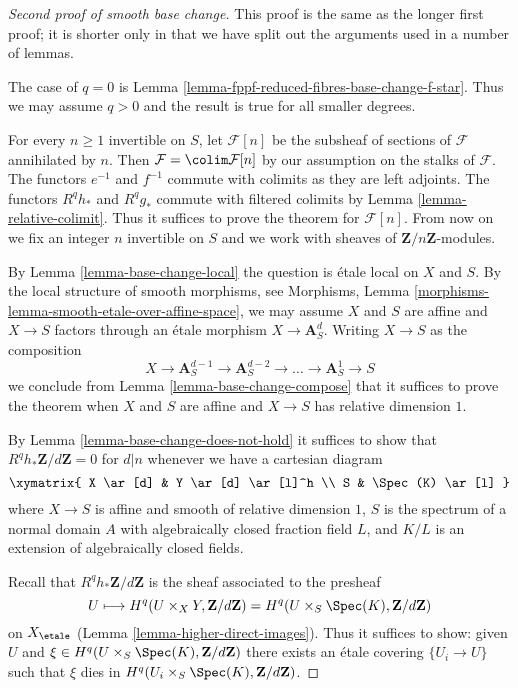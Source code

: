 \begin{proof}[Second proof of smooth base change]
This proof is the same as the longer first proof;
it is shorter only in that we have split out the
arguments used in a number of lemmas.

\medskip\noindent
The case of $q = 0$ is
Lemma \ref{lemma-fppf-reduced-fibres-base-change-f-star}.
Thus we may assume $q > 0$ and the result is true
for all smaller degrees.

\medskip\noindent
For every $n \geq 1$ invertible on $S$, let $\mathcal{F}[n]$
be the subsheaf of sections of $\mathcal{F}$ annihilated by $n$. Then
$\mathcal{F} = \colim \mathcal{F}[n]$ by our assumption on
the stalks of $\mathcal{F}$. The functors $e^{-1}$ and $f^{-1}$
commute with colimits as they are left adjoints. The functors
$R^qh_*$ and $R^qg_*$ commute with filtered colimits by
Lemma \ref{lemma-relative-colimit}.
Thus it suffices to prove the theorem for $\mathcal{F}[n]$.
From now on we fix an integer $n$ invertible on $S$ and we work with
sheaves of $\mathbf{Z}/n\mathbf{Z}$-modules.

\medskip\noindent
By Lemma \ref{lemma-base-change-local} the question is \'etale local
on $X$ and $S$. By the local structure of smooth morphisms, see
Morphisms, Lemma \ref{morphisms-lemma-smooth-etale-over-affine-space},
we may assume $X$ and $S$ are affine and $X \to S$
factors through an \'etale morphism $X \to \mathbf{A}^d_S$.
Writing $X \to S$ as the composition
$$
X \to \mathbf{A}^{d - 1}_S \to \mathbf{A}^{d - 2}_S \to \ldots \to
\mathbf{A}^1_S \to S
$$
we conclude from Lemma \ref{lemma-base-change-compose}
that it suffices to prove the theorem when $X$ and $S$
are affine and $X \to S$ has relative dimension $1$.

\medskip\noindent
By Lemma \ref{lemma-base-change-does-not-hold} it suffices to show that
$R^qh_*\mathbf{Z}/d\mathbf{Z} = 0$ for $d | n$ whenever we have a
cartesian diagram
$$
\xymatrix{
X \ar[d] & Y \ar[d] \ar[l]^h \\
S & \Spec(K) \ar[l]
}
$$
where $X \to S$ is affine and smooth of relative dimension $1$,
$S$ is the spectrum of a normal
domain $A$ with algebraically closed fraction field $L$,
and $K/L$ is an extension of algebraically closed fields.

\medskip\noindent
Recall that $R^qh_*\mathbf{Z}/d\mathbf{Z}$ is the sheaf associated
to the presheaf
$$
U \longmapsto
H^q(U \times_X Y, \mathbf{Z}/d\mathbf{Z}) =
H^q(U \times_S \Spec(K), \mathbf{Z}/d\mathbf{Z})
$$
on $X_\etale$ (Lemma \ref{lemma-higher-direct-images}).
Thus it suffices to show: given $U$ and
$\xi \in H^q(U \times_S \Spec(K), \mathbf{Z}/d\mathbf{Z})$
there exists an \'etale covering $\{U_i \to U\}$
such that $\xi$ dies in $H^q(U_i \times_S \Spec(K), \mathbf{Z}/d\mathbf{Z})$.


\end{proof}
